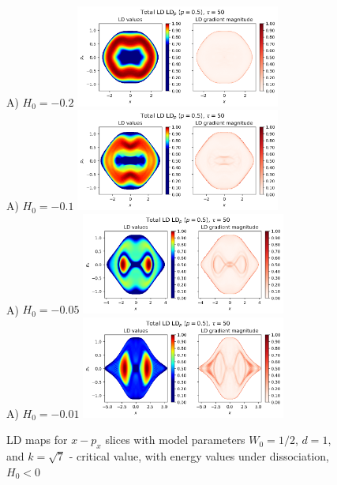 \documentclass[10pt,aps,onecolumn,superscriptaddress]{revtex4-2}
\begin{document}
\begin{figure}
    \centering
    A) $H_0 = -0.2$ \includegraphics[width=0.6\textwidth]{LD_H0_-0_2_x-px_PES_bifurcation.png}\\
    A) $H_0 = -0.1$ \includegraphics[width=0.6\textwidth]{LD_H0_-0_1_x-px_PES_bifurcation.png}\\
    A) $H_0 = -0.05$ \includegraphics[width=0.6\textwidth]{LD_H0_-0_05_x-px_PES_bifurcation.png}\\
    A) $H_0 = -0.01$ \includegraphics[width=0.6\textwidth]{LD_H0_-0_01_x-px_PES_bifurcation.png}
    \caption{LD maps for $x-p_x$ slices with model parameters $W_0 = 1/2$, $d = 1$, and $k = \sqrt{7}$ - critical value, with energy values under dissociation, $H_0 < 0$}
\end{figure}
\end{document}
